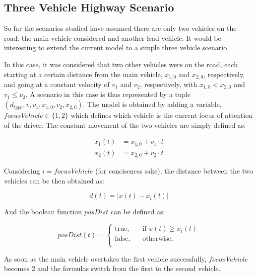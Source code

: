 \subsection{Three Vehicle Highway Scenario}

So far the scenarios studied have assumed there are only two vehicles on the road: the main vehicle considered and another lead vehicle. It would be interesting to extend the current model to a simple three vehicle scenario. 

In this case, it was considered that two other vehicles were on the road, each starting at a certain distance from the main vehicle, $x_{1,0}$ and $x_{2,0}$, respectively, and going at a constant velocity of $v_1$ and $v_2$, respectively, with $x_{1,0} < x_{2,0}$ and $v_1 \leq v_2$. A scenario in this case is thus represented by a tuple $(d_{type}, v, v_1, x_{1,0}, v_2, x_{2,0})$. The model is obtained by adding a variable, $focusVehicle \in \{1,2\}$ which defines which vehicle is the current focus of attention of the driver. The constant movement of the two vehicles are simply defined as:

\begin{equation}
\begin{aligned}
	x_1(t) & = x_{1,0} + v_1\cdot t\\
	x_2(t) & = x_{2,0} + v_2\cdot t
\end{aligned}
\end{equation}

Considering $i = focusVehicle$ (for conciseness sake), the distance between the two vehicles can be then obtained as:

\begin{equation}
	d(t) = \lvert x(t) - x_i(t) \rvert
\end{equation}

And the boolean function $posDist$ can be defined as:

\begin{equation}
posDist(t) = 
     \begin{cases}
       \text{true,} &\quad\text{if }x(t) \geq x_i(t)\\
       \text{false,} &\quad\text{otherwise.} \\
     \end{cases}
\end{equation}

As soon as the main vehicle overtakes the first vehicle successfully, $focusVehicle$ becomes $2$ and the formulas switch from the first to the second vehicle. 

